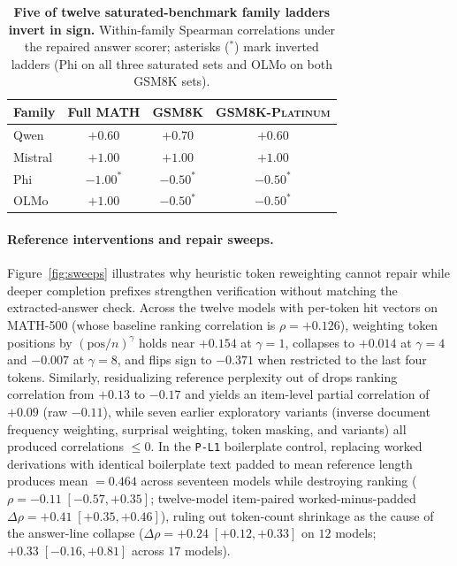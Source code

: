 \begin{table}[t]
\centering
\caption{\textbf{Five of twelve saturated-benchmark family ladders invert in sign.} Within-family Spearman correlations under the repaired answer scorer; asterisks ($^*$) mark inverted ladders (Phi on all three saturated sets and OLMo on both \textsc{GSM8K} sets).}
\label{tab:ladders-sat}
\scriptsize
\setlength{\tabcolsep}{3pt}
\begin{tabular}{@{}lccc@{}}
\toprule
Family & Full \textsc{MATH} & \textsc{GSM8K} & \textsc{GSM8K-Platinum} \\
\midrule
Qwen & $+0.60$ & $+0.70$ & $+0.60$ \\
Mistral & $+1.00$ & $+1.00$ & $+1.00$ \\
Phi & $-1.00^*$ & $-0.50^*$ & $-0.50^*$ \\
OLMo & $+1.00$ & $-0.50^*$ & $-0.50^*$ \\
\bottomrule
\end{tabular}
\end{table}

\paragraph{Reference interventions and repair sweeps.}
Figure~\ref{fig:sweeps} illustrates why heuristic token reweighting cannot repair \tfa{} while deeper completion prefixes strengthen verification without matching the extracted-answer check.
Across the twelve models with per-token hit vectors on \textsc{MATH-500} (whose baseline ranking correlation is $\rho = +0.126$), weighting token positions by $(\mathrm{pos}/n)^\gamma$ holds near $+0.154$ at $\gamma{=}1$, collapses to $+0.014$ at $\gamma{=}4$ and $-0.007$ at $\gamma{=}8$, and flips sign to $-0.371$ when restricted to the last four tokens.
Similarly, residualizing reference perplexity out of \tfa{} drops ranking correlation from $+0.13$ to $-0.17$ and yields an item-level partial correlation of $+0.09$ (raw $-0.11$), while seven earlier exploratory variants (inverse document frequency weighting, surprisal weighting, token masking, and variants) all produced correlations $\le 0$.
In the \texttt{P-L1} boilerplate control, replacing worked derivations with identical boilerplate text padded to mean reference length produces mean \tfa{} $= 0.464$ across seventeen models while destroying ranking ($\rho = -0.11 \; [-0.57, +0.35]$; twelve-model item-paired worked-minus-padded $\Delta\rho = +0.41 \; [+0.35, +0.46]$), ruling out token-count shrinkage as the cause of the answer-line collapse ($\Delta\rho = +0.24 \; [+0.12, +0.33]$ on $12$ models; $+0.33 \; [-0.16, +0.81]$ across $17$ models).

